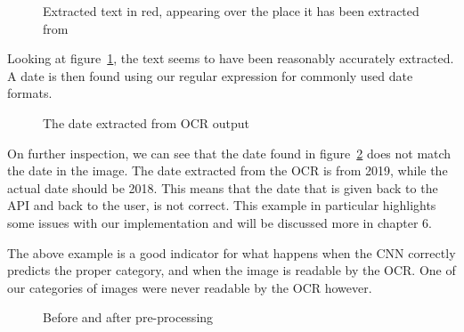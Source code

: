\begin{figure}[h]
    \caption{Extracted text in red, appearing over the place it has been extracted from}
    \label{fig:ocrtextboxes}
\end{figure}
\clearpage
Looking at figure~\ref{fig:ocrtextboxes}, the text seems to have been reasonably accurately extracted.
A date is then found using our regular expression for commonly used date formats.

\begin{figure}[h]
    \caption{The date extracted from OCR output}
    \label{fig:dateocr}
\end{figure}

On further inspection, we can see that the date found in figure~\ref{fig:dateocr} does not match the date in
the image.
The date extracted from the OCR is from 2019, while the actual date should be 2018.
This means that the date that is given back to the API and back to the user, is not correct.
This example in particular highlights some issues with our implementation and will be discussed more in chapter 6.

The above example is a good indicator for what happens when the CNN correctly predicts the proper category, and when the image is readable by the OCR\@.
One of our categories of images were never readable by the OCR however.

\begin{figure}[h]
    \caption{Before and after pre-processing}
    \label{fig:beforeafterflybuss}
\end{figure}

